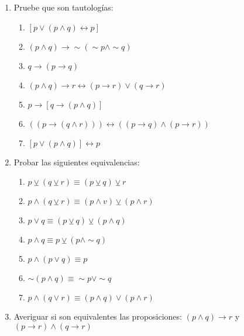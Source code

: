 {\begin{enumerate}
\begin{enumerate}
\item $\left[\left(p\rightarrow q\right)\rightarrow\left(q\rightarrow p\right)\right]\leftrightarrow\left(p\vee\sim q\right)$
\item $p\veebar\left(q\vee r\right)$
\item $\sim\left(\sim p\leftrightarrow q\right)$
\item $\sim\left(\sim q\leftrightarrow p\right)$
\item $\left(p\wedge\sim q\right)\rightarrow\left(\sim p\vee q\right)$
\item $\left[p\wedge\left(\sim q\rightarrow p\right)\right]\wedge\left[\left(p\leftrightarrow\sim q\right)\rightarrow\left(q\vee\sim p\right)\right]$
\end{enumerate}
\item Pruebe que son tautologías:

\begin{enumerate}
\item $\left[p\vee\left(p\wedge q\right)\leftrightarrow p\right]$
\item $\left(p\wedge q\right)\rightarrow\sim\left(\sim p\wedge\sim q\right)$
\item $q\rightarrow\left(p\rightarrow q\right)$
\item $\left(p\wedge q\right)\rightarrow r\leftrightarrow\left(p\rightarrow r\right)\vee\left(q\rightarrow r\right)$
\item $p\rightarrow\left[q\rightarrow\left(p\wedge q\right)\right]$
\item $\left(\left(p\rightarrow\left(q\wedge r\right)\right)\right)\leftrightarrow\left(\left(p\rightarrow q\right)\wedge\left(p\rightarrow r\right)\right)$
\item $\left[p\vee\left(p\wedge q\right)\right]\leftrightarrow p$
\end{enumerate}
\item Probar las siguientes equivalencias: 

\begin{enumerate}
\item $p\veebar\left(q\veebar r\right)\equiv\left(p\veebar q\right)\veebar r$
\item $p\wedge\left(q\veebar r\right)\equiv\left(p\wedge v\right)\veebar\left(p\wedge r\right)$
\item $p\vee q\equiv\left(p\veebar q\right)\veebar\left(p\wedge q\right)$
\item $p\wedge q\equiv p\veebar\left(p\wedge\sim q\right)$
\item $p\wedge\left(p\vee q\right)\equiv p$
\item $\sim\left(p\wedge q\right)\equiv\sim p\vee\sim q$
\item $p\wedge\left(q\vee r\right)\equiv\left(p\wedge q\right)\vee\left(p\wedge r\right)$
\end{enumerate}
\item 	 	 Averiguar si son equivalentes las proposiciones: \medskip{}
$(p\wedge q)\rightarrow r$ y $\left(p\rightarrow r\right)\wedge\left(q\rightarrow r\right)$
	

\end{enumerate}}
